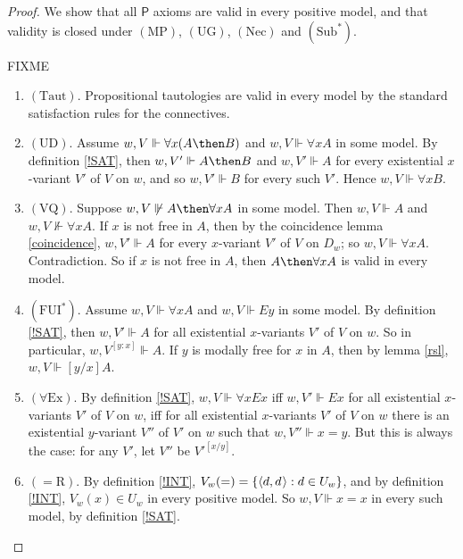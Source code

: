 \documentclass[11pt]{woarticle}
\theoremstyle{break}
\theoremstyle{nonumberplain}
\newcommand{\s}[1]{\ensuremath{\mathsf{#1}}}
\newcommand{\SAT}{\Vdash}
\newcommand{\1}{\;\,|\;\,}
\renewcommand{\t}[1]{\ensuremath{\langle #1  \makebox[.2ex]{}\rangle}}
\newcommand{\T}[1]{\ensuremath{(\mathrm{ #1})}}
\begin{document}
\begin{proof}
  We show that all \s{P} axioms are valid in every positive model, and that
  validity is closed under \T{MP}, \T{UG}, \T{Nec} and \T{Sub^*}.

  FIXME
  \begin{enumerate}

    \item \T{Taut}.\; Propositional tautologies are valid in every model by the
          standard satisfaction rules for the connectives.

    \item \T{UD}.\; Assume $w,V \SAT \forall x(A \then B)$ and
          $w,V \SAT \forall x A$ in some model. By definition \ref{!SAT}, then
          $w,V'\SAT A \then B$ and $w,V'\SAT A$ for every existential
          $x$-variant $V'$ of $V$ on $w$, and so $w,V'\SAT B$ for every such
          $V'$. Hence $w,V \SAT \forall x B$.

    \item \T{VQ}.\; Suppose $w,V \not\SAT A \then \forall x A$ in some model.
          Then $w,V \SAT A$ and $w,V \not\SAT \forall x A$. If $x$ is not free
          in $A$, then by the coincidence lemma \ref{coincidence}, $w,V' \SAT A$
          for every $x$-variant $V'$ of $V$ on $D_w$; so $w,V \SAT \forall x A$.
          Contradiction. So if $x$ is not free in $A$, then
          $A \then \forall x A$ is valid in every model.

    \item \T{FUI^*}.\; Assume $w,V \SAT \forall x A$ and $w,V \SAT Ey$ in some
          model. By definition \ref{!SAT}, then $w,V' \SAT A$ for all
          existential $x$-variants $V'$ of $V$ on $w$. So in particular,
          $w,V^{[y:x]} \SAT A$. If $y$ is modally free for $x$ in $A$, then by
          lemma \ref{rsl}, $w,V \SAT [y/x]A$.

    \item \T{\forall Ex}.\; By definition \ref{!SAT}, $w,V \SAT \forall x Ex$
          iff $w,V'\SAT Ex$ for all existential $x$-variants $V'$ of $V$ on $w$,
          iff for all existential $x$-variants $V'$ of $V$ on $w$ there is an
          existential $y$-variant $V''$ of $V'$ on $w$ such that
          $w,V'' \SAT x\!=\!y$. But this is always the case: for any $V'$, let
          $V''$ be $V'^{[x/y]}$.

    \item \T{=\!R}.\; By definition \ref{!INT},
          $V_w(=) = \{ \t{d,d} : d \in U_w \}$, and by definition \ref{!INT},
          $V_w(x) \in U_w$ in every positive model. So $w,V \SAT x\!=\!x$ in
          every such model, by definition \ref{!SAT}.


\end{enumerate}
\end{proof}
\end{document}
